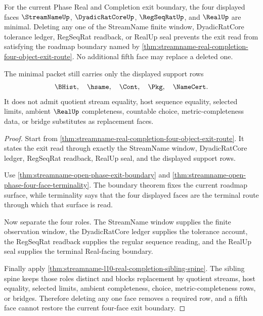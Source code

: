 \begin{theorem}
\label{thm:streamname-open-phase-four-face-minimality}
For the current Phase Real and Completion exit boundary, the four displayed faces $\StreamNameUp$, $\DyadicRatCoreUp$, $\RegSeqRatUp$, and $\RealUp$ are minimal. Deleting any one of the StreamName finite window, DyadicRatCore tolerance ledger, RegSeqRat readback, or RealUp seal prevents the exit read from satisfying the roadmap boundary named by \autoref{thm:streamname-real-completion-four-object-exit-route}. No additional fifth face may replace a deleted one.

The minimal packet still carries only the displayed support rows
$$
\BHist,\quad \hsame,\quad \Cont,\quad \Pkg,\quad \NameCert.
$$
It does not admit quotient stream equality, host sequence equality, selected limits, ambient $\RealUp$ completeness, countable choice, metric-completeness data, or bridge substitutes as replacement faces.
\end{theorem}
\begin{proof}
Start from \autoref{thm:streamname-real-completion-four-object-exit-route}. It states the exit read through exactly the StreamName window, DyadicRatCore ledger, RegSeqRat readback, RealUp seal, and the displayed support rows.

Use \autoref{thm:streamname-open-phase-exit-boundary} and \autoref{thm:streamname-open-phase-four-face-terminality}. The boundary theorem fixes the current roadmap surface, while terminality says that the four displayed faces are the terminal route through which that surface is read.

Now separate the four roles. The StreamName window supplies the finite observation window, the DyadicRatCore ledger supplies the tolerance account, the RegSeqRat readback supplies the regular sequence reading, and the RealUp seal supplies the terminal Real-facing boundary.

Finally apply \autoref{thm:streamname-l10-real-completion-sibling-spine}. The sibling spine keeps those roles distinct and blocks replacement by quotient streams, host equality, selected limits, ambient completeness, choice, metric-completeness rows, or bridges. Therefore deleting any one face removes a required row, and a fifth face cannot restore the current four-face exit boundary.
\end{proof}

